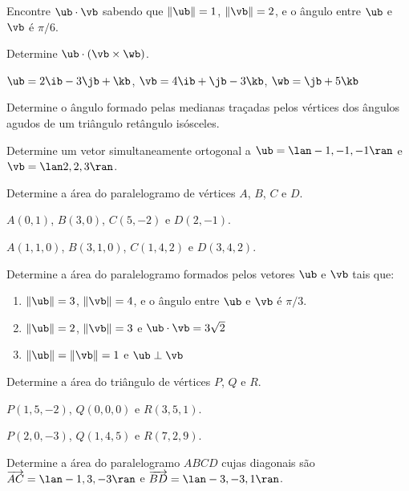 \item Encontre $\ub\cdot\vb$ sabendo que $\|\ub\|=1$, $\|\vb\|=2$, e o ângulo entre $\ub$ e $\vb$ é $\pi/6$.
\item Determine $\ub\cdot(\vb \times \wb)$.
    \begin{enumerate}[leftmargin=*]
        \begin{multicols}{2}
            \item $\ub = 2\ib - 3\jb + \kb$, $\vb = 4\ib + \jb - 3\kb$, $\wb = \jb + 5\kb$
        \end{multicols}
        
    \end{enumerate}
\item Determine o ângulo formado pelas medianas traçadas pelos vértices dos ângulos agudos de um triângulo retângulo isósceles.

\item Determine um vetor simultaneamente ortogonal a $\ub=\lan -1,-1,-1\ran$ e $\vb=\lan 2,2,3\ran$.

\item [\textcolor{blue}{24-25}]Determine a área do paralelogramo de vértices $A$, $B$, $C$ e $D$.
 
\item $A(0,1)$, $B(3,0)$, $C(5,-2)$ e $D(2,-1)$.
\item $A(1,1,0)$, $B(3,1,0)$, $C(1,4,2)$ e $D(3,4,2)$.

\item Determine a área do paralelogramo formados pelos vetores $\ub$ e $\vb$ tais que:
    \begin{enumerate}[leftmargin=*]
        \item $\|\ub\|=3$, $\|\vb\|=4$, e o ângulo entre $\ub$ e $\vb$ é $\pi/3$.
        \item $\|\ub\|=2$, $\|\vb\|=3$ e $\ub\cdot\vb=3\sqrt{2}$
        \item $\|\ub\|=\|\vb\|=1$ e $\ub \perp \vb$
    \end{enumerate}
    

\item [\textcolor{blue}{27-28}]Determine a área do triângulo de vértices $P$, $Q$ e $R$.
    
\item $P(1, 5, -2)$, $Q(0, 0, 0)$ e $R(3, 5, 1)$.

\item $P(2, 0, -3)$, $Q(1, 4, 5)$ e $R(7, 2, 9)$.

 \item Determine a área do paralelogramo $ABCD$ cujas diagonais são $\overrightarrow{AC}=\lan -1,3,-3\ran$ e $\overrightarrow{BD}=\lan -3,-3,1\ran$.
 
